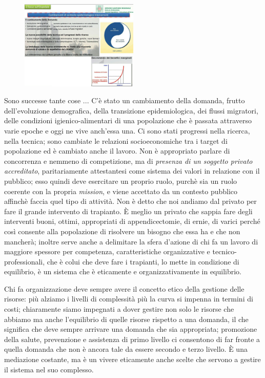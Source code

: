  \begin{figure}[!ht]
\centering
	\includegraphics[width=0.5\textwidth]{32/image9.jpeg}
	\end{figure}

Sono successe tante cose ... C'è stato un cambiamento della domanda,
frutto dell'evoluzione demografica, della transizione epidemiologica,
dei flussi migratori, delle condizioni igienico-alimentari di una
popolazione che è passata attraverso varie epoche e oggi ne vive
anch'essa una. Ci sono stati progressi nella ricerca, nella tecnica;
sono cambiate le relazioni socioeconomiche tra i target di popolazione
ed è cambiato anche il lavoro. Non è appropriato parlare di concorrenza
e nemmeno di competizione, ma di \emph{presenza di un soggetto privato
accreditato}, paritariamente attestantesi come sistema dei valori in
relazione con il pubblico; esso quindi deve esercitare un proprio ruolo,
purchè sia un ruolo coerente con la propria \emph{mission}, e viene
accettato da un contesto pubblico affinchè faccia quel tipo di attività.
Non è detto che noi andiamo dal privato per fare il grande intervento di
trapianto. È meglio un privato che sappia fare degli interventi buoni,
ottimi, appropriati di appendicectomie, di ernie, di varici perché così
consente alla popolazione di risolvere un bisogno che essa ha e che non
mancherà; inoltre serve anche a delimitare la sfera d'azione di chi fa
un lavoro di maggiore spessore per competenza, caratteristiche
organizzative e tecnico-professionali, che è colui che deve fare i
trapianti, lo mette in condizione di equilibrio, è un sistema che è
eticamente e organizzativamente in equilibrio.

Chi fa organizzazione deve sempre avere il concetto etico della gestione
delle risorse: più alziamo i livelli di complessità più la curva si
impenna in termini di costi; chiaramente siamo impegnati a dover gestire
non solo le risorse che abbiamo ma anche l'equilibrio di quelle risorse
rispetto a una domanda, il che significa che deve sempre arrivare una
domanda che sia appropriata; promozione della salute, prevenzione e
assistenza di primo livello ci consentono di far fronte a quella domanda
che non è ancora tale da essere secondo e terzo livello. È una
mediazione costante, ma è un vivere eticamente anche scelte che servono
a gestire il sistema nel suo complesso.

